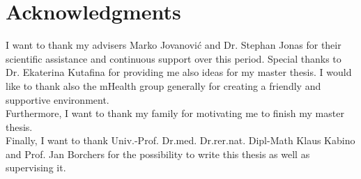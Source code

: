\cleardoublepage

\chapter*{Acknowledgments}

I want to thank my advisers Marko Jovanovi{\' c} and Dr. Stephan Jonas for their scientific assistance and continuous support over this period. Special thanks to Dr. Ekaterina Kutafina for providing me also ideas for my master thesis.
I would like to thank also the mHealth group generally for creating a friendly and supportive environment.\\
Furthermore, I want to thank my family for motivating me to finish my master thesis.\\
Finally, I want to thank Univ.-Prof. Dr.med. Dr.rer.nat. Dipl-Math Klaus Kabino and Prof. Jan Borchers for the possibility to write this thesis as well as supervising it.